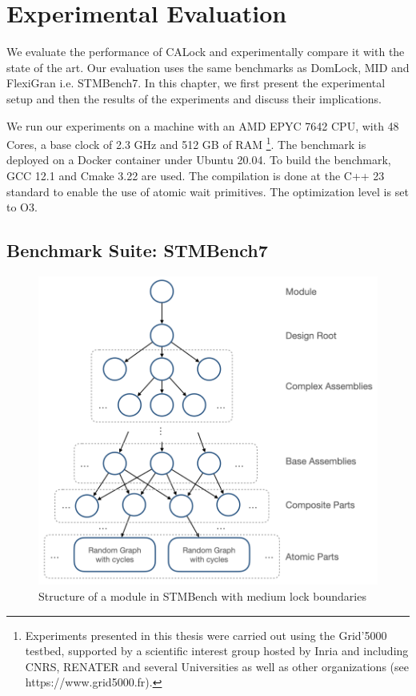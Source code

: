 


\chapter{Experimental Evaluation} \label{chap:evaluation}

\minitoc

We evaluate the performance of CALock and experimentally compare it with the state of the art. Our evaluation uses the same benchmarks as DomLock, MID and FlexiGran \cite{kalikar2016domlock,anjuMID,FlexiGran2024} i.e. STMBench7\cite{guerraoui2006stmbench7}. In this chapter, we first present the experimental setup and then the results of the experiments and discuss their implications. 

We run our experiments on a machine with an AMD EPYC 7642 CPU, with 48 Cores, a base clock of 2.3 GHz and 512 GB of RAM \footnote{Experiments presented in this thesis were carried out using the Grid'5000 testbed, supported by a scientific interest group hosted by Inria and including CNRS, RENATER and several Universities as well as other organizations (see https://www.grid5000.fr).}. 
The benchmark is deployed on a Docker container under Ubuntu 20.04. 
To build the benchmark, GCC 12.1 and Cmake 3.22 are used. The compilation is done at the C++ 23 standard to enable the use of atomic wait primitives. The optimization level is set to O3.




\section{Benchmark Suite: STMBench7}
	
	
	\begin{figure}
		\centering
		\captionsetup{justification=centering}
		\includegraphics[width=.8\columnwidth]{figures/stmbenchModule}
		\caption{Structure of a module in STMBench with medium lock boundaries}
		\label{stmbenchModule}
	\end{figure}

